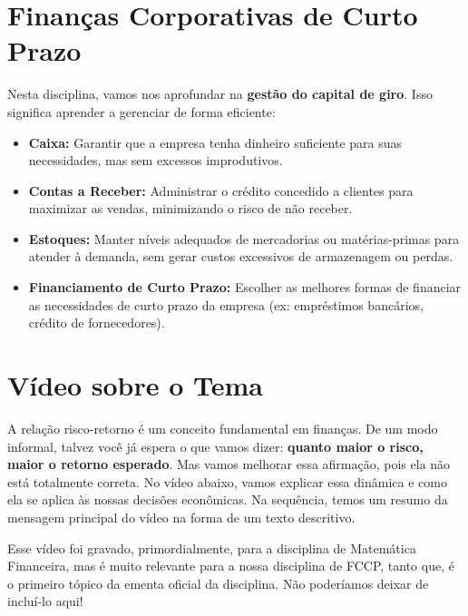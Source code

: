\documentclass[
  a4paper,
]{book}
\begin{document}
\section{\texorpdfstring{\textbf{Finanças Corporativas de Curto
Prazo}}{Finanças Corporativas de Curto Prazo}}\label{finanuxe7as-corporativas-de-curto-prazo}

Nesta disciplina, vamos nos aprofundar na \textbf{gestão do capital de
giro}. Isso significa aprender a gerenciar de forma eficiente:

\begin{itemize}
\item
  \textbf{Caixa:} Garantir que a empresa tenha dinheiro suficiente para
  suas necessidades, mas sem excessos improdutivos.
\item
  \textbf{Contas a Receber:} Administrar o crédito concedido a clientes
  para maximizar as vendas, minimizando o risco de não receber.
\item
  \textbf{Estoques:} Manter níveis adequados de mercadorias ou
  matérias-primas para atender à demanda, sem gerar custos excessivos de
  armazenagem ou perdas.
\item
  \textbf{Financiamento de Curto Prazo:} Escolher as melhores formas de
  financiar as necessidades de curto prazo da empresa (ex: empréstimos
  bancários, crédito de fornecedores).
\end{itemize}

\section*{\texorpdfstring{\textbf{Vídeo sobre o
Tema}}{Vídeo sobre o Tema}}\label{vuxeddeo-sobre-o-tema}


A relação risco-retorno é um conceito fundamental em finanças. De um
modo informal, talvez você já espera o que vamos dizer: \textbf{quanto
maior o risco, maior o retorno esperado}. Mas vamos melhorar essa
afirmação, pois ela não está totalmente correta. No vídeo abaixo, vamos
explicar essa dinâmica e como ela se aplica às nossas decisões
econômicas. Na sequência, temos um resumo da mensagem principal do vídeo
na forma de um texto descritivo.

Esse vídeo foi gravado, primordialmente, para a disciplina de Matemática
Financeira, mas é muito relevante para a nossa disciplina de FCCP, tanto
que, é o primeiro tópico da ementa oficial da disciplina. Não poderíamos
deixar de incluí-lo aqui!
\end{document}
